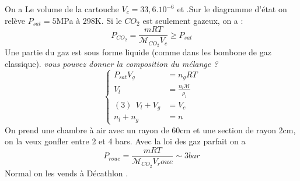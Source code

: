 \begin{Answer}
		On a Le volume de la cartouche $V_c= 33,6.10^{-6}$  et .Sur le diagramme d'état on relève $P_{sat} = 5 $MPa à 298K. Si le $CO_2$ est seulement gazeux, on a :
		\[ P_{CO_2} = \frac{mRT}{\mathcal{M}_{CO_2}V_c} \geq P_{sat} \]
		Une partie du gaz est sous forme liquide (comme dans les bombone de gaz classique).
		\emph{vous pouvez donner la composition du mélange ?}
		\[
		\begin{cases}
		P_{sat} V_g &= n_g R T \\
		V_l &= \frac{n_l \mathcal{M}}{\rho_l} \\
		(3)~~ V_l +V_g &=V_c \\
		n_l +n_g &= n
		\end{cases}\]
		On prend une chambre à air avec un rayon de 60cm et une section de rayon 2cm, on la veux gonfler entre 2 et 4 bars. Avec la loi des gaz parfait on a
		\[P_{roue} =    \frac{mRT}{\mathcal{M}_{CO_2}V_roue} \sim 3 bar \]
		Normal on les vends à Décathlon .
\end{Answer}
